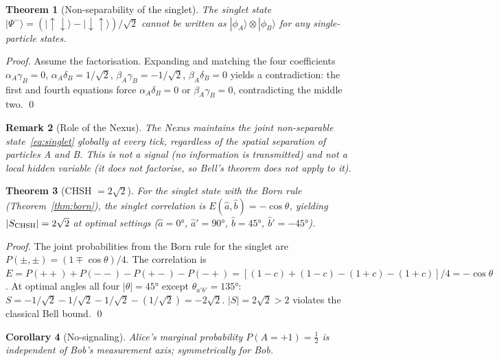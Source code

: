\documentclass[11pt,a4paper]{article}
\newtheorem{theorem}{Theorem}[section]
\newtheorem{corollary}[theorem]{Corollary}
\newtheorem{remark}[theorem]{Remark}
\newcommand{\ket}[1]{|#1\rangle}
\begin{document}
\begin{theorem}[Non-separability of the singlet]
\label{thm:nonsep}
The singlet state $\ket{\Psi^-} = (\ket{\uparrow\downarrow} -
\ket{\downarrow\uparrow})/\sqrt{2}$ cannot be written as
$\ket{\phi_A}\otimes\ket{\phi_B}$ for any single-particle states.
\end{theorem}

\begin{proof}
Assume the factorisation. Expanding and matching the four coefficients
$\alpha_A\gamma_B = 0$, $\alpha_A\delta_B = 1/\sqrt2$,
$\beta_A\gamma_B = -1/\sqrt2$, $\beta_A\delta_B = 0$ yields a
contradiction: the first and fourth equations force $\alpha_A\delta_B = 0$
or $\beta_A\gamma_B = 0$, contradicting the middle two. \qed
\end{proof}

\begin{remark}[Role of the Nexus]
The Nexus maintains the joint non-separable state~\eqref{eq:singlet}
globally at every tick, regardless of the spatial separation of particles
A and B. This is not a signal (no information is transmitted) and not a
local hidden variable (it does not factorise, so Bell's theorem does not
apply to it).
\end{remark}

\begin{theorem}[CHSH $= 2\sqrt{2}$]
\label{thm:chsh}
For the singlet state with the Born rule (Theorem~\ref{thm:born}),
the singlet correlation is $E(\hat{a},\hat{b}) = -\cos\theta$,
yielding $|S_{\rm CHSH}| = 2\sqrt{2}$ at optimal settings
($\hat{a}=0°$, $\hat{a}'=90°$, $\hat{b}=45°$, $\hat{b}'=-45°$).
\end{theorem}

\begin{proof}
The joint probabilities from the Born rule for the singlet are
$P(\pm,\pm) = (1\mp\cos\theta)/4$.
The correlation is
$E = P(++) + P(--) - P(+-) - P(-+)
= [(1{-}c) + (1{-}c) - (1{+}c) - (1{+}c)]/4 = -\cos\theta$.
At optimal angles all four $|\theta| = 45°$ except $\theta_{a'b'} = 135°$:
$S = -1/\sqrt2 - 1/\sqrt2 - 1/\sqrt2 - (1/\sqrt2) = -2\sqrt2$.
$|S| = 2\sqrt2 > 2$ violates the classical Bell bound. \qed
\end{proof}

\begin{corollary}[No-signaling]
Alice's marginal probability $P(A{=}+1) = \tfrac12$ is independent of
Bob's measurement axis; symmetrically for Bob.
\end{corollary}
\end{document}
